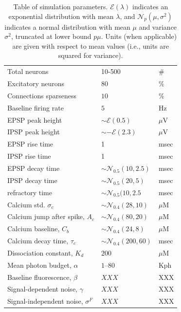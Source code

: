 \begin{table}[h!b!p!]
\caption{Table of simulation parameters. $\mathcal{E}(\lambda)$ indicates an exponential distribution with mean $\lambda$, and $\mathcal{N}_p(\mu,\sigma^2)$ indicates a normal distribution with mean $\mu$ and variance $\sigma^2$, truncated at lower bound $p\mu$.  Units (when applicable) are given with respect to mean values (i.e., units are squared for variance).}\label{table:caparm}

\begin{tabular}{lll}
\hline
Total neurons & 10-500 & \# \\
Excitatory neurons & $80$ & $\%$ \\
Connections sparseness & $10$   & $\%$ \\
Baseline firing rate & $5$ & Hz\\
\hline
EPSP peak height 	& $\sim \mathcal{E}(0.5)$ & $\mu$V \\
IPSP peak height 	& $\sim -\mathcal{E}(2.3)$ & $\mu$V \\
EPSP rise time 		& 1 & msec \\
IPSP rise time 		& 1 & msec \\
EPSP decay time 	& $\sim \mathcal{N}_{0.5}(10,2.5)$ & msec \\
IPSP decay time 	& $\sim \mathcal{N}_{0.5}(20,5)$ & msec\\
refractory time 	& $\sim \mathcal{N}_{0.5}(10,2.5$ & msec \\
\hline
Calcium std. $\sigma_c$ & $\sim \mathcal{N}_{0.4}(28,10)$ & $\mu$M\\
Calcium jump after spike, $A_c$ &  $\sim \mathcal{N}_{0.4}(80,20)$ & $\mu$M\\
Calcium baseline, $C_b$ & $\sim \mathcal{N}_{0.4}(24,8)$ & $\mu$M\\
Calcium decay time, $\tau_c$ & $\sim \mathcal{N}_{0.4}(200,60)$ & msec\\
Dissociation constant, $K_d$ & $200$ & $\mu$M \\
\hline
Mean photon budget, $\alpha$ & $1$--$80$ & Kph \\
Baseline fluorescence, $\beta$ & $XXX$ & XXX \\
Signal-dependent noise, $\gamma$ & $XXX$ & XXX \\
Signal-independent noise, $\sigma^F$ & $XXX$ & XXX \\
\end{tabular}
\end{table}